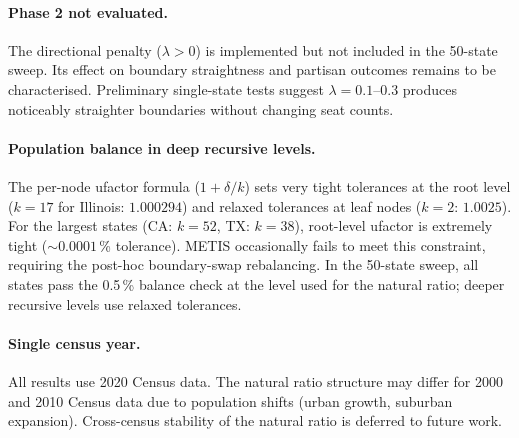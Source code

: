 \paragraph{Phase 2 not evaluated.}
The directional penalty ($\lambda > 0$) is implemented but not included in
the 50-state sweep.
Its effect on boundary straightness and partisan outcomes remains to be
characterised.
Preliminary single-state tests suggest $\lambda = 0.1$--$0.3$ produces
noticeably straighter boundaries without changing seat counts.

\paragraph{Population balance in deep recursive levels.}
The per-node ufactor formula ($1 + \delta/k$) sets very tight tolerances
at the root level ($k=17$ for Illinois: $1.000294$) and relaxed tolerances
at leaf nodes ($k=2$: $1.0025$).
For the largest states (CA: $k=52$, TX: $k=38$), root-level ufactor is
extremely tight ($\sim 0.0001$\,\% tolerance).
METIS occasionally fails to meet this constraint, requiring the post-hoc
boundary-swap rebalancing.
In the 50-state sweep, all states pass the 0.5\,\% balance check at the
level used for the natural ratio; deeper recursive levels use relaxed
tolerances.

\paragraph{Single census year.}
All results use 2020 Census data.
The natural ratio structure may differ for 2000 and 2010 Census data
due to population shifts (urban growth, suburban expansion).
Cross-census stability of the natural ratio is deferred to future work.
